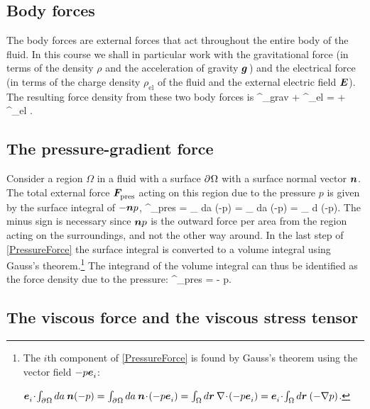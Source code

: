 \subsection{Body forces}

The body forces are external forces that act throughout the entire
body of the fluid. In this course we shall in particular work with
the gravitational force (in terms of the density $\rho$ and the
acceleration of gravity $\bm{g}^{{}_{}}$) and the electrical force (in terms
of the charge density $\rho^{{}}_\textrm{el}$ of the fluid and the
external electric field $\bm{E}$). The resulting force density from
these two body forces is
%
 \fff^{{}}_\textrm{grav} + \fff^{{}}_\textrm{el} =
 \rho \ggn + \rho^{{}}_\textrm{el} \EEE.
 \eeq

\subsection{The pressure-gradient force}

Consider a region $\Omega$ in a fluid with a surface $\partial^{{}} \Omega$
with a surface normal vector $\bm{n}$. The total external force
$\bm{F}^{{}}_\textrm{pres}$ acting on this region due to the
pressure $p$ is given by the surface integral of $-\bm{n} p$,
%
 \FFF^{{}}_\textrm{pres} =
 \int_{\pp \Omega} da\: (-\nnn p) =
 \int_{\pp \Omega} da\: \nnn (-p) =
 \int_{\Omega} d\rrr\: (-\nabla p).
 \eeq
%
The minus sign is necessary since $\bm{n} p$ is the outward force
per area from the region acting on the surroundings, and not the
other way around. In the last step of \eqref{PressureForce} the
surface integral is converted to a volume integral using Gauss's
theorem.\footnote{The $i$th component of \eqref{PressureForce} is
found by Gauss's theorem using the vector field $-p
\bm{e}^{{}_{}}_i$:\\
\centerline{$\een_i\scap\int_{\pp \Omega} da\: \nnn (-p) =
\int_{\pp \Omega} da\: \nnn\scap(-p \een_i) = \int_{\Omega}
d\rrr\: \nabla\scap(-p\een_i) = \een_i\scap\int_{\Omega} d\rrr\:
(-\nabla p)$.}} The integrand of the
volume integral can thus be identified as the force density due to
the pressure:
%
 \fff^{{}}_\textrm{pres} = - \nabla p.
 \eeq
%


\subsection{The viscous force and the viscous stress tensor}

